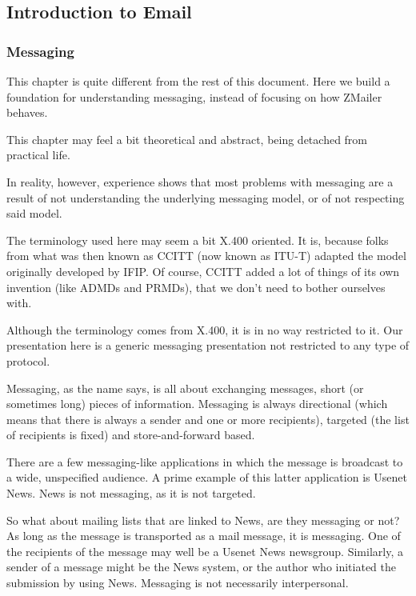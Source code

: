 
\subsection{Introduction to Email}

\subsubsection{Messaging}

This chapter is quite different from the rest of this document.
Here we build a foundation for understanding messaging, instead
of focusing on how ZMailer behaves.

This chapter may feel a bit theoretical and abstract, being detached
from practical life.

In reality, however, experience shows that most problems with messaging
are a result of not understanding the underlying messaging model, or of
not respecting said model.

The terminology used here may seem a bit X.400 oriented.
It is, because folks from what was then known as CCITT (now known as ITU-T)
adapted the model originally developed by IFIP.
Of course, CCITT added a lot of things of its own invention (like
ADMDs and PRMDs), that we don't need to bother ourselves with.

Although the terminology comes from X.400, it is in no way restricted to it.
Our presentation here is a generic messaging presentation not restricted
to any type of protocol.

Messaging, as the name says, is all about exchanging messages,
short (or sometimes long) pieces of information.
Messaging is always directional (which means that there is always
a sender and one or more recipients), targeted (the list of recipients
is fixed) and store-and-forward based.

There are a few messaging-like applications in which the message is
broadcast to a wide, unspecified audience.
A prime example of this latter application is Usenet News.
News is not messaging, as it is not targeted.

So what about mailing lists that are linked to News, are they messaging or not?
As long as the message is transported as a mail message, it is messaging.
One of the recipients of the message may well be a Usenet News newsgroup.
Similarly, a sender of a message might be the News system, or the author
who initiated the submission by using News. Messaging is not necessarily
interpersonal.

